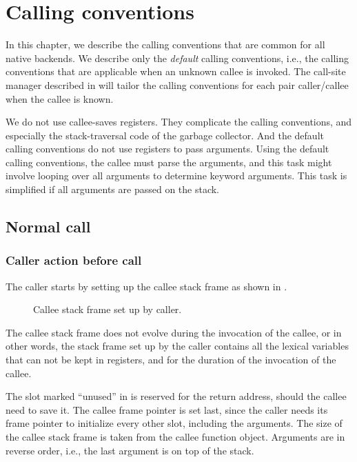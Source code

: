 \chapter{Calling conventions}
\label{chap-calling-conventions}

In this chapter, we describe the \sysname{} calling conventions that
are common for all native backends.  We describe only the
\emph{default} calling conventions, i.e., the calling conventions that
are applicable when an unknown callee is invoked.  The call-site
manager described in  will tailor the
calling conventions for each pair caller/callee when the callee is
known. 

We do not use callee-saves registers.  They complicate the calling
conventions, and especially the stack-traversal code of the garbage
collector.  And the default calling conventions do not use registers
to pass arguments.  Using the default calling conventions, the callee
must parse the arguments, and this task might involve looping over all
arguments to determine keyword arguments.  This task is simplified if
all arguments are passed on the stack.

\section{Normal call}

\subsection{Caller action before call}
\label{sec-caller-action-before-call}

The caller starts by setting up the callee stack frame as
shown in .

\begin{figure}
\begin{center}
\end{center}
\caption{\label{fig-initial-callee-stack-frame}
Callee stack frame set up by caller.}
\end{figure}

The callee stack frame does not evolve during the invocation of the
callee, or in other words, the stack frame set up by the caller
contains all the lexical variables that can not be kept in registers,
and for the duration of the invocation of the callee.

The slot marked ``unused'' in 
is reserved for the return address, should the callee need to save it.
The callee frame pointer is set last, since the caller needs its frame
pointer to initialize every other slot, including the arguments.  The
size of the callee stack frame is taken from the callee function
object.  Arguments are in reverse order, i.e., the last argument is on
top of the stack.

